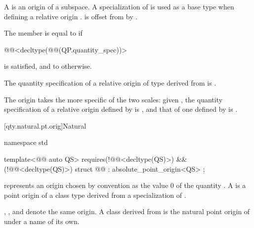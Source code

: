 \pnum
A  is an origin
of a subspace.
A specialization of  is used as a base type when defining a relative origin .
 is offset from 
by .

\pnum
The member  is equal to
 if
\begin{codeblock}
@@<decltype(@@(QP.quantity_spec))>
\end{codeblock}
is satisfied, and
to  otherwise.

\pnum
The quantity specification 
of a relative origin  of type  derived from  is
.
\begin{note}
The origin takes the more specific of the two scales:
given ,
the quantity specification of a relative origin defined by  is
, and
that of one defined by  is .
\end{note}

[qty.natural.pt.orig]{Natural}

\begin{codeblock}
namespace std {

template<@@ auto QS>
  requires(!@@<decltype(QS)>) && (!@@<decltype(QS)>)
struct @@ : absolute_point_origin<QS> {};

}
\end{codeblock}

\pnum
{} represents an origin
chosen by convention as the value $0$ of the quantity .
A  is a point origin
of a class type derived from a specialization of .
\begin{note}
, ,
and  denote the same origin.
A class derived from  is the natural point origin of 
under a name of its own.
\end{note}

